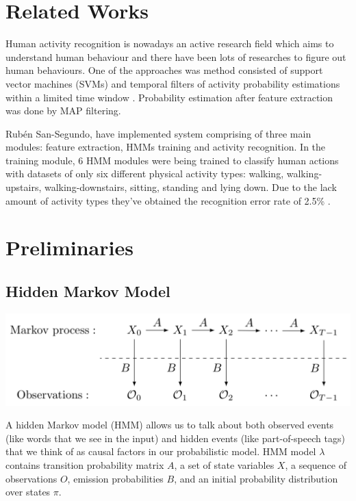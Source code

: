 \documentclass[10pt,twocolumn,letterpaper]{article}
\begin{document}
\section{Related Works}
Human activity recognition is nowadays an active research field which aims to understand human behaviour and there have been lots of researches to figure out human behaviours. One of the approaches was method consisted of support vector machines (SVMs) and temporal filters of activity probability estimations within a limited time window \cite{haptpaper}. Probability estimation after feature extraction was done by MAP filtering.

Rubén San-Segundo, \etal have implemented system comprising of three main modules: feature extraction, HMMs training and activity recognition. In the training module, 6 HMM modules were being trained to classify human actions with datasets of only six different physical activity types: walking, walking-upstairs, walking-downstairs, sitting, standing and lying down. Due to the lack amount of activity types they've obtained the recognition error rate of 2.5\% \cite{monitoring}.

\section{Preliminaries}

\subsection{Hidden Markov Model}

\begin{center}
\includegraphics[width=1.0\linewidth]{./HMM.png}
\end{center}

A hidden Markov model (HMM) allows us to talk about both observed events (like words that we see in the input) and hidden events (like part-of-speech tags) that we think of as causal factors in our probabilistic model. HMM model $\lambda$ contains transition probability matrix $A$, a set of state variables $X$, a sequence of observations $O$, emission probabilities $B$, and an initial probability distribution over states $\pi$.
\end{document}

